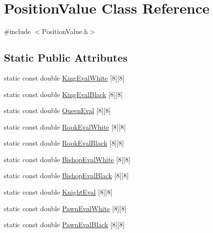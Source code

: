 \hypertarget{class_position_value}{}\section{Position\+Value Class Reference}
\label{class_position_value}


{\ttfamily \#include $<$Position\+Value.\+h$>$}

\subsection*{Static Public Attributes}
\begin{DoxyCompactItemize}
\item 
static const double \hyperlink{class_position_value_aec855fb63f378b211e23377d79a1c7f9}{King\+Eval\+White} \mbox{[}8\mbox{]}\mbox{[}8\mbox{]}
\item 
static const double \hyperlink{class_position_value_aedabcf02811afe49b3680eee682882ed}{King\+Eval\+Black} \mbox{[}8\mbox{]}\mbox{[}8\mbox{]}
\item 
static const double \hyperlink{class_position_value_a8cb8ebb700f65d2fe88157b1075b4e65}{Queen\+Eval} \mbox{[}8\mbox{]}\mbox{[}8\mbox{]}
\item 
static const double \hyperlink{class_position_value_a9998ca8f631fce65d1978dd70bacefe3}{Rook\+Eval\+White} \mbox{[}8\mbox{]}\mbox{[}8\mbox{]}
\item 
static const double \hyperlink{class_position_value_a3e647b26938d16c61f83f62b7b6a99b4}{Rook\+Eval\+Black} \mbox{[}8\mbox{]}\mbox{[}8\mbox{]}
\item 
static const double \hyperlink{class_position_value_ad604441bdc402c2929c771c6b107b4af}{Bishop\+Eval\+White} \mbox{[}8\mbox{]}\mbox{[}8\mbox{]}
\item 
static const double \hyperlink{class_position_value_aa492a3e22caecca103849320217a4707}{Bishop\+Eval\+Black} \mbox{[}8\mbox{]}\mbox{[}8\mbox{]}
\item 
static const double \hyperlink{class_position_value_a5087b40bba07ffb7f04253cdd22ac70c}{Knight\+Eval} \mbox{[}8\mbox{]}\mbox{[}8\mbox{]}
\item 
static const double \hyperlink{class_position_value_adbc7e125bfdd9749060f62e269e9b02a}{Pawn\+Eval\+White} \mbox{[}8\mbox{]}\mbox{[}8\mbox{]}
\item 
static const double \hyperlink{class_position_value_a4b09d260029ea68a73f44ddf92db45be}{Pawn\+Eval\+Black} \mbox{[}8\mbox{]}\mbox{[}8\mbox{]}
\end{DoxyCompactItemize}


